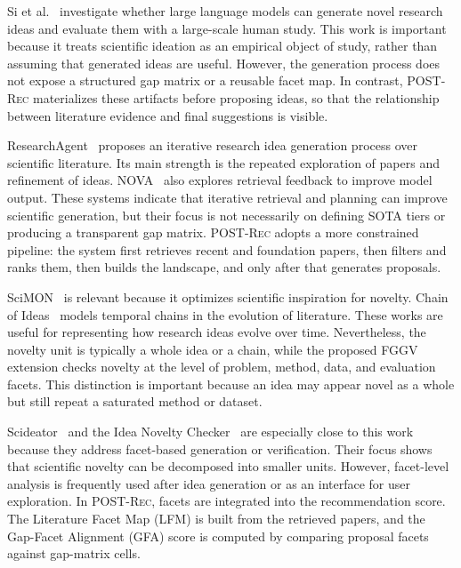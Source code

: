 \documentclass[preprint,12pt]{elsarticle}
\begin{document}
Si et al.~\cite{si2025llmideas} investigate whether large language models can generate novel research ideas and evaluate them with a large-scale human study. This work is important because it treats scientific ideation as an empirical object of study, rather than assuming that generated ideas are useful. However, the generation process does not expose a structured gap matrix or a reusable facet map. In contrast, \textsc{POST-Rec} materializes these artifacts before proposing ideas, so that the relationship between literature evidence and final suggestions is visible.

ResearchAgent~\cite{baek2025researchagent} proposes an iterative research idea generation process over scientific literature. Its main strength is the repeated exploration of papers and refinement of ideas. NOVA~\cite{hu2025nova} also explores retrieval feedback to improve model output. These systems indicate that iterative retrieval and planning can improve scientific generation, but their focus is not necessarily on defining SOTA tiers or producing a transparent gap matrix. \textsc{POST-Rec} adopts a more constrained pipeline: the system first retrieves recent and foundation papers, then filters and ranks them, then builds the landscape, and only after that generates proposals.

SciMON~\cite{wang2024scimon} is relevant because it optimizes scientific inspiration for novelty. Chain of Ideas~\cite{li2025coi} models temporal chains in the evolution of literature. These works are useful for representing how research ideas evolve over time. Nevertheless, the novelty unit is typically a whole idea or a chain, while the proposed FGGV extension checks novelty at the level of problem, method, data, and evaluation facets. This distinction is important because an idea may appear novel as a whole but still repeat a saturated method or dataset.

Scideator~\cite{roy2024scideator} and the Idea Novelty Checker~\cite{ramesh2025inc} are especially close to this work because they address facet-based generation or verification. Their focus shows that scientific novelty can be decomposed into smaller units. However, facet-level analysis is frequently used after idea generation or as an interface for user exploration. In \textsc{POST-Rec}, facets are integrated into the recommendation score. The Literature Facet Map (LFM) is built from the retrieved papers, and the Gap-Facet Alignment (GFA) score is computed by comparing proposal facets against gap-matrix cells.
\end{document}
